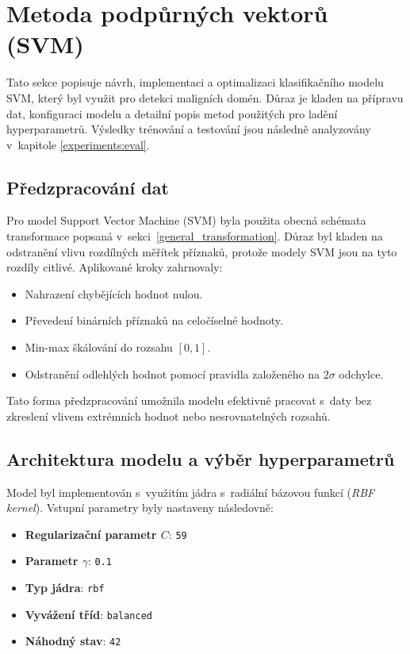 \section{Metoda podpůrných vektorů (SVM)}

Tato sekce popisuje návrh, implementaci a optimalizaci klasifikačního modelu SVM, který byl využit pro detekci maligních domén. Důraz je kladen na přípravu dat, konfiguraci modelu a detailní popis metod použitých pro ladění hyperparametrů. Výsledky trénování a testování jsou následně analyzovány v~kapitole \ref{experiments:eval}.

\subsection{Předzpracování dat}

Pro model Support Vector Machine (SVM) byla použita obecná schémata transformace popsaná v~sekci~\ref{general_transformation}. Důraz byl kladen na odstranění vlivu rozdílných měřítek příznaků, protože modely SVM jsou na tyto rozdíly citlivé. Aplikované kroky zahrnovaly:

\begin{itemize}
    \item Nahrazení chybějících hodnot nulou.
    \item Převedení binárních příznaků na celočíselné hodnoty.
    \item Min-max škálování do rozsahu $[0, 1]$.
    \item Odstranění odlehlých hodnot pomocí pravidla založeného na $2\sigma$ odchylce.
\end{itemize}

Tato forma předzpracování umožnila modelu efektivně pracovat s~daty bez zkreslení vlivem extrémních hodnot nebo nesrovnatelných rozsahů.


\subsection{Architektura modelu a výběr hyperparametrů}

Model byl implementován s~využitím jádra s~radiální bázovou funkcí (\textit{RBF kernel}). Vstupní parametry byly nastaveny následovně:

\begin{itemize}
    \item \textbf{Regularizační parametr $C$}: \texttt{59}
    \item \textbf{Parametr $\gamma$}: \texttt{0.1}
    \item \textbf{Typ jádra}: \texttt{rbf}
    \item \textbf{Vyvážení tříd}: \texttt{balanced}
    \item \textbf{Náhodný stav}: \texttt{42}
\end{itemize}

